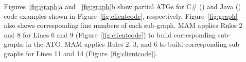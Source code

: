 Figures~\ref{fig:graph}a and ~\ref{fig:graph}b show partial ATGs for
C\# () and Java ()
code examples shown in Figure~\ref{fig:clientcode}, respectively.
Figure~\ref{fig:graph} also shows corresponding line numbers of each
sub-graph. MAM applies Rules 2 and 8 for Lines 6 and 9
(Figure~\ref{fig:clientcode}) to build corresponding sub-graphs in
the ATG. MAM applies Rules 2, 3, and 6 to build corresponding
sub-graphs for Lines 11 and 14 (Figure~\ref{fig:clientcode}).


